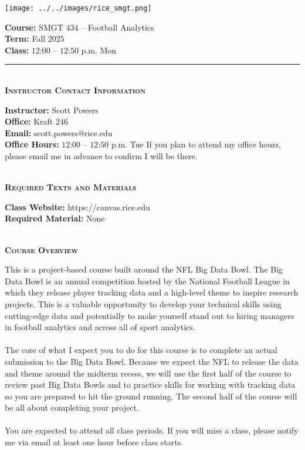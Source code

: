 \documentclass[11pt]{article}
\begin{document}
\begin{minipage}[c]{0.4\linewidth}
  \texttt{[image: ../../images/rice\_smgt.png]}
\end{minipage}
\begin{minipage}[c]{0.6\linewidth}
  \raggedleft
  {\bf Course:} SMGT $434$ -- Football Analytics\\
  {\bf Term:} Fall $2025$\\
  {\bf Class:} $12$:$00$ -- $12$:$50$ p.m. Mon
\end{minipage}

\hrule

~\\
\textbf{\textsc{Instructor Contact Information}}
\begin{adjustwidth}{1cm}{0cm}
	{\bf Instructor:} Scott Powers\\
  {\bf Office:} Kraft $246$\\
  {\bf Email:} scott.powers@rice.edu\\
  {\bf Office Hours:} $12$:$00$ -- $12$:$50$ p.m. Tue
  If you plan to attend my office hours, please email me in advance to confirm I will be there.
\end{adjustwidth}

~\\
\textbf{\textsc{Required Texts and Materials}}
\begin{adjustwidth}{1cm}{0cm}
	{\bf Class Website:} https://canvas.rice.edu\\
	{\bf Required Material:} None
\end{adjustwidth}

~\\
\textbf{\textsc{Course Overview}}
\begin{adjustwidth}{1cm}{0cm}
  This is a project-based course built around the NFL Big Data Bowl. The Big Data Bowl is an annual competition hosted by the National Football League in which they release player tracking data and a high-level theme to inspire research projects. This is a valuable opportunity to develop your technical skills using cutting-edge data and potentially to make yourself stand out to hiring managers in football analytics and across all of sport analytics.\\
  ~\\
  The core of what I expect you to do for this course is to complete an actual submission to the Big Data Bowl. Because we expect the NFL to release the data and theme around the midterm recess, we will use the first half of the course to review past Big Data Bowls and to practice skills for working with tracking data so you are prepared to hit the ground running. The second half of the course will be all about completing your project.\\
  ~\\
  You are expected to attend all class periods. If you will miss a class, please notify me via email at least one hour before class starts.
\end{adjustwidth}
\end{document}
